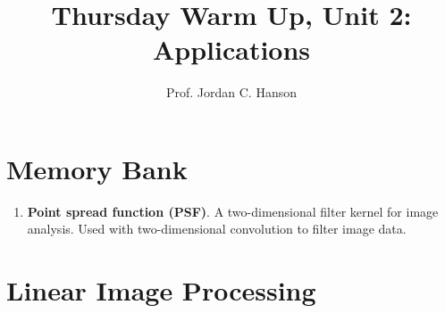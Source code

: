 \documentclass{article}
\begin{document}
\twocolumn

\title{Thursday Warm Up, Unit 2: Applications}
\author{Prof. Jordan C. Hanson}
\maketitle

\section{Memory Bank}

\begin{enumerate}
\item \textbf{Point spread function (PSF)}. A two-dimensional filter kernel for image analysis.  Used with two-dimensional convolution to filter image data.
\end{enumerate}

\section{Linear Image Processing}
\end{document}
